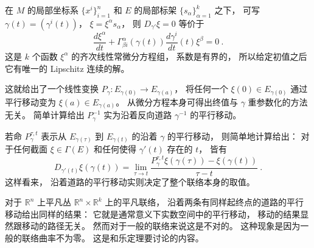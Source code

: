 在 $M$ 的局部坐标系 $\{x^i\}_{i=1}^n$ 和 $E$ 的局部标架 $\{s_{\alpha}\}_{\alpha=1}^k$ 之下， 可写 $\gamma(t)=(\gamma^i(t))$， $\xi=\xi^\alpha s_\alpha$， 则 $D_{\gamma'}\xi=0$ 等价于
$$
\frac{d\xi^\alpha}{dt}+\Gamma_{\beta i}^\alpha(\gamma(t))\frac{d\gamma^i}{dt}(t)\xi^\beta=0~.
$$
这是 $k$ 个函数 $\xi^\alpha$ 的齐次线性常微分方程组， 系数是有界的， 所以给定初值之后它有唯一的 Lipschitz 连续的解。 

这就给出了一个线性变换 $P_{\gamma}:E_{\gamma(0)}\to E_{\gamma(a)}$， 将任何一个 $\xi(0)\in E_{\gamma(0)}$ 通过平行移动变为 $\xi(a)\in E_{\gamma(a)}$。 从微分方程本身可得出终值与 $\gamma$ 重参数化的方法无关。 简单计算给出 $P_\gamma^{-1}$ 实为沿着反向道路 $\gamma^{-1}$ 的平行移动。 

若命 $P_\gamma^{\tau,t}$ 表示从 $E_{\gamma(\tau)}$ 到 $E_{\gamma(t)}$ 的沿着 $\gamma$ 的平行移动， 则简单地计算给出： 对于任何截面 $\xi\in\Gamma(E)$ 和任何使得 $\gamma'(t)$ 存在的 $t$， 皆有
$$
D_{\gamma'(t)}\xi(\gamma(t))=\lim_{\tau\to t}\frac{P_\gamma^{\tau,t}\xi(\gamma(\tau))-\xi(\gamma(t))}{\tau-t}~.
$$
这样看来， 沿着道路的平行移动实则决定了整个联络本身的取值。

对于 $\mathbb{R}^n$ 上平凡丛 $\mathbb{R}^n\times\mathbb{R}^k$ 上的平凡联络， 沿着两条有同样起终点的道路的平行移动给出同样的结果： 它就是通常意义下实数空间中的平行移动， 移动的结果显然跟移动的路径无关。 然而对于一般的联络来说这是不对的。 这种现象是因为一般的联络曲率不为零。 这是和乐定理要讨论的内容。
